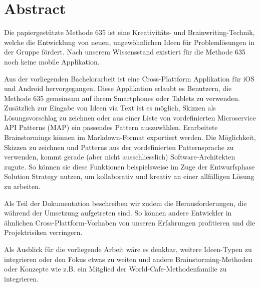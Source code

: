 \thispagestyle{empty}
\section*{Abstract}


Die papiergestützte Methode 635 ist eine Kreativitäts- und Brainwriting-Technik, welche die Entwicklung von neuen, ungewöhnlichen Ideen für Problemlösungen in der Gruppe fördert. Nach unserem Wissensstand existiert für die Methode 635 noch keine mobile Applikation.

Aus der vorliegenden Bachelorarbeit ist eine Cross-Plattform Applikation für iOS und Android hervorgegangen. Diese Applikation erlaubt es Benutzern, die Methode 635 gemeinsam auf ihrem Smartphones oder Tablets zu verwenden. Zusätzlich zur Eingabe von Ideen via Text ist es möglich, Skizzen als Lösungsvorschlag zu zeichnen oder aus einer Liste von vordefinierten Microservice API Patterns (MAP) ein passendes Pattern auszuwählen. Erarbeitete Brainstormings können im Markdown-Format exportiert werden. Die Möglichkeit, Skizzen zu zeichnen und Patterns aus der vordefinierten Patternsprache zu verwenden, kommt gerade (aber nicht ausschliesslich) Software-Architekten zugute. So können sie diese Funktionen beispielsweise im Zuge der Entwurfsphase Solution Strategy nutzen, um kollaborativ und kreativ an einer allfälligen Lösung zu arbeiten.

Als Teil der Dokumentation beschreiben wir zudem die Herausforderungen, die während der Umsetzung aufgetreten sind. So können andere Entwickler in ähnlichen Cross-Plattform-Vorhaben von unseren Erfahrungen profitieren und die Projektrisiken verringern.

Als Ausblick für die vorliegende Arbeit wäre es denkbar, weitere Ideen-Typen zu integrieren oder den Fokus etwas zu weiten und andere Brainstorming-Methoden oder Konzepte wie z.B. ein Mitglied der World-Cafe-Methodenfamilie zu integrieren. 

